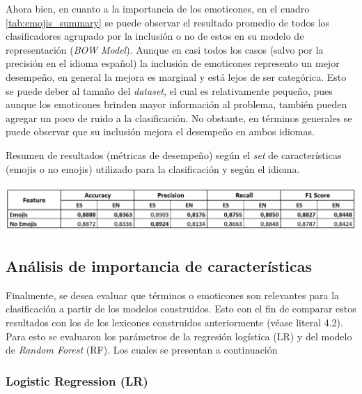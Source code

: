 Ahora bien, en cuanto a la importancia de los emoticones, en el cuadro \ref{tab:emojis_summary} se puede observar el resultado promedio de todos los clasificadores agrupado por la inclusión o no de estos en su modelo de representación (\textit{BOW Model}). Aunque en casi todos los casos (salvo por la precisión en el idioma español) la inclusión de emoticones represento un mejor desempeño, en general la mejora es marginal y está lejos de ser categórica. Esto se puede deber al tamaño del \textit{dataset}, el cual es relativamente pequeño, pues aunque los emoticones brinden mayor información al problema, también pueden agregar un poco de ruido a la clasificación. No obstante, en términos generales se puede observar que su inclusión mejora el desempeño en ambos idiomas. 

\begin{table}[H]
    \centering
    \caption{Resumen de resultados (métricas de desempeño) según el \textit{set} de características (emojis o no emojis) utilizado para la clasificación y según el idioma.}
    \label{tab:emojis_summary}
    \includegraphics[width=\textwidth]{doc/images/summary_results_emoji.png}
\end{table}

\subsection{Análisis de importancia de características}

Finalmente, se desea evaluar que términos o emoticones son relevantes para la clasificación a partir de los modelos construidos. Esto con el fin de comparar estos resultados con los de los lexicones construidos anteriormente (véase literal 4.2). Para esto se evaluaron los parámetros de la regresión logística (LR) y del modelo de \textit{Random Forest} (RF). Los cuales se presentan a continuación

\subsubsection{Logistic Regression (LR)}

